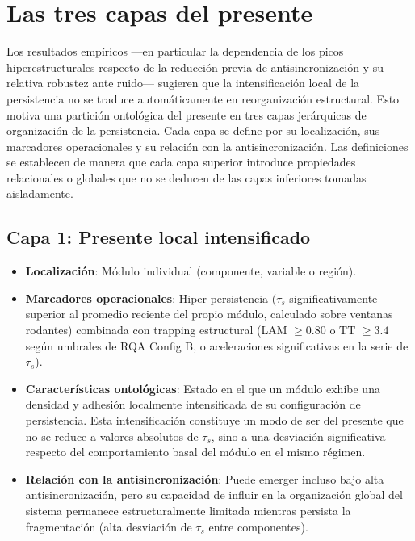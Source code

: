 \section{Las tres capas del presente}

Los resultados empíricos —en particular la dependencia de los picos hiperestructurales respecto de la reducción previa de antisincronización y su relativa robustez ante ruido— sugieren que la intensificación local de la persistencia no se traduce automáticamente en reorganización estructural. Esto motiva una partición ontológica del presente en tres capas jerárquicas de organización de la persistencia. Cada capa se define por su localización, sus marcadores operacionales y su relación con la antisincronización. Las definiciones se establecen de manera que cada capa superior introduce propiedades relacionales o globales que no se deducen de las capas inferiores tomadas aisladamente.

\subsection{Capa 1: Presente local intensificado}

\begin{itemize}
    \item \textbf{Localización}: Módulo individual (componente, variable o región).
    \item \textbf{Marcadores operacionales}: Hiper-persistencia ($\tau_s$ significativamente superior al promedio reciente del propio módulo, calculado sobre ventanas rodantes) combinada con trapping estructural (LAM $\geq 0.80$ o TT $\geq 3.4$ según umbrales de RQA Config B, o aceleraciones significativas en la serie de $\tau_s$).
    \item \textbf{Características ontológicas}: Estado en el que un módulo exhibe una densidad y adhesión localmente intensificada de su configuración de persistencia. Esta intensificación constituye un modo de ser del presente que no se reduce a valores absolutos de $\tau_s$, sino a una desviación significativa respecto del comportamiento basal del módulo en el mismo régimen.
    \item \textbf{Relación con la antisincronización}: Puede emerger incluso bajo alta antisincronización, pero su capacidad de influir en la organización global del sistema permanece estructuralmente limitada mientras persista la fragmentación (alta desviación de $\tau_s$ entre componentes).
\end{itemize}

